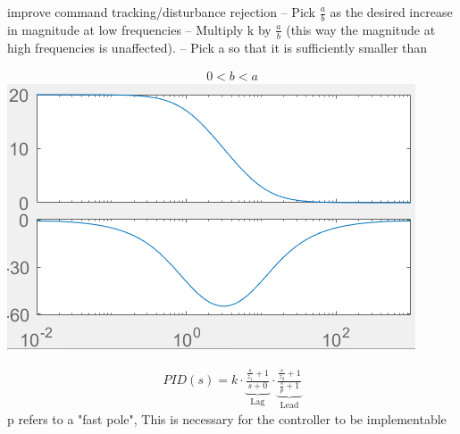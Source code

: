     \begin{minipage}{0.49\linewidth}
        improve command tracking/disturbance
rejection
– Pick $\frac{a}{b}$ as the desired increase in magnitude at low frequencies
– Multiply k by $\frac{a}{b}$ (this way the magnitude at high frequencies is unaffected).
– Pick a so that it is sufficiently smaller than
    \end{minipage}
    \begin{minipage}{0.49\linewidth}
        \begin{align*}
            0 < b < a
        \end{align*}
        \includegraphics[width = \linewidth]{src/images/lag-controller.png}
    \end{minipage}

        \begin{align*}
            PID(s) = k \cdot \underbrace{\frac{\frac{s}{z_1} + 1}{s + 0}}_{\text{Lag}} \cdot \underbrace{\frac{\frac{s}{z_2} + 1}{\frac{s}{p} + 1}}_{\text{Lead}}
        \end{align*}
        p refers to a "fast pole", This is necessary for the controller to be implementable